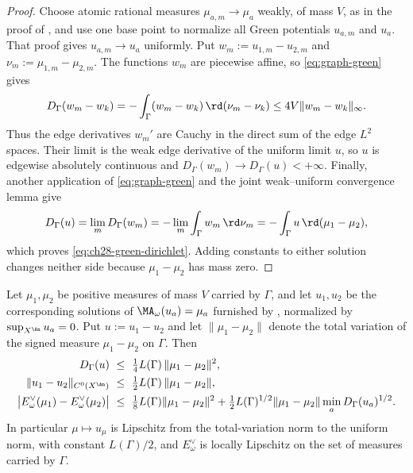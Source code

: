 \begin{proof}
Choose atomic rational measures $\mu_{a,m}\to\mu_a$ weakly, of mass $V$,
as in the proof of , and use one base point to
normalize all Green potentials $u_{a,m}$ and $u_a$.  That proof gives
$u_{a,m}\to u_a$ uniformly.  Put $w_m:=u_{1,m}-u_{2,m}$ and
$\nu_m:=\mu_{1,m}-\mu_{2,m}$.  The functions $w_m$ are piecewise affine,
so \eqref{eq:graph-green} gives
\[
 D_\Gamma(w_m-w_k)
 =-\int_\Gamma(w_m-w_k)\,\rd(\nu_m-\nu_k)
 \leq4V\lVert w_m-w_k\rVert_\infty.
\]
Thus the edge derivatives $w_m'$ are Cauchy in the direct sum of the edge
$L^2$ spaces.  Their limit is the weak edge derivative of the uniform
limit $u$, so $u$ is edgewise absolutely continuous and
$D_\Gamma(w_m)\to D_\Gamma(u)<+\infty$.  Finally, another application of
\eqref{eq:graph-green} and the joint weak--uniform convergence lemma
 give
\[
 D_\Gamma(u)
 =\lim_mD_\Gamma(w_m)
 =-\lim_m\int_\Gamma w_m\,\rd\nu_m
 =-\int_\Gamma u\,\rd(\mu_1-\mu_2),
\]
which proves \eqref{eq:ch28-green-dirichlet}.  Adding constants to either
solution changes neither side because $\mu_1-\mu_2$ has mass zero.
\end{proof}

\begin{theorem}
\label{thm:ch28-curve-stability}
Let $\mu_1,\mu_2$ be positive measures of mass $V$ carried by
$\Gamma$, and let $u_1,u_2$ be the corresponding solutions of
$\MA_\omega(u_a)=\mu_a$ furnished by
, normalized by
$\sup_{X^{\An}}u_a=0$.  Put $u:=u_1-u_2$ and let
$\lVert\mu_1-\mu_2\rVert$ denote the total variation of the signed measure
$\mu_1-\mu_2$ on $\Gamma$.  Then
\begin{align}
\label{eq:ch28-curve-stability-dirichlet}
 D_\Gamma(u)&\ \leq\ \tfrac14L(\Gamma)\,
       \lVert\mu_1-\mu_2\rVert^2,\\
\label{eq:ch28-curve-stability-sup}
 \lVert u_1-u_2\rVert_{C^0(X^{\An})}
   &\ \leq\ \tfrac12L(\Gamma)\,
       \lVert\mu_1-\mu_2\rVert ,\\
\label{eq:ch28-curve-stability-dual}
 \bigl|E^\vee_\omega(\mu_1)-E^\vee_\omega(\mu_2)\bigr|
   &\ \leq\ \tfrac18L(\Gamma)\lVert\mu_1-\mu_2\rVert^2
      +\tfrac12L(\Gamma)^{1/2}\lVert\mu_1-\mu_2\rVert
        \min_aD_\Gamma(u_a)^{1/2}.
\end{align}
In particular $\mu\mapsto u_\mu$ is Lipschitz from the total-variation
norm to the uniform norm, with constant $L(\Gamma)/2$, and
$E^\vee_\omega$ is locally Lipschitz on the set of measures carried by
$\Gamma$.
\end{theorem}

